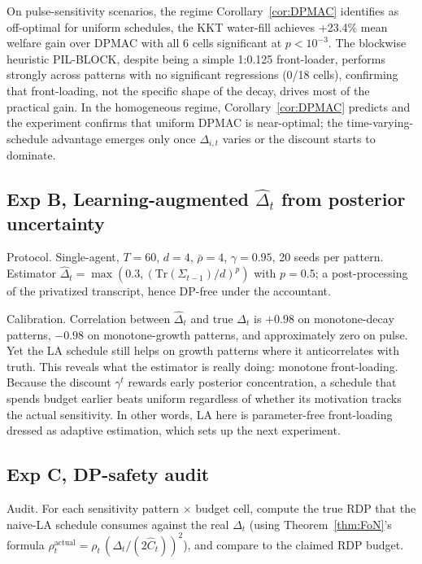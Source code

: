 \documentclass{article}
\begin{document}
On pulse-sensitivity scenarios, the regime Corollary~\ref{cor:DPMAC} identifies as off-optimal for uniform schedules, the KKT water-fill achieves +23.4\% mean welfare gain over DPMAC with all 6 cells significant at $p<10^{-3}$. The blockwise heuristic PIL-BLOCK, despite being a simple 1:0.125 front-loader, performs strongly across patterns with no significant regressions (0/18 cells), confirming that front-loading, not the specific shape of the decay, drives most of the practical gain. In the homogeneous regime, Corollary~\ref{cor:DPMAC} predicts and the experiment confirms that uniform DPMAC is near-optimal; the time-varying-schedule advantage emerges only once $\Delta_{i,t}$ varies or the discount starts to dominate.


\subsection{Exp B, Learning-augmented $\hat\Delta_t$ from posterior uncertainty}

Protocol. Single-agent, $T = 60$, $d = 4$, $\bar\rho = 4$, $\gamma = 0.95$, 20 seeds per pattern. Estimator $\hat\Delta_t = \max(0.3, (\mathrm{Tr}(\Sigma_{t-1})/d)^p)$ with $p = 0.5$; a post-processing of the privatized transcript, hence DP-free under the accountant.

Calibration. Correlation between $\hat\Delta_t$ and true $\Delta_t$ is $+0.98$ on monotone-decay patterns, $-0.98$ on monotone-growth patterns, and approximately zero on pulse. Yet the LA schedule still helps on growth patterns where it anticorrelates with truth. This reveals what the estimator is really doing: monotone front-loading. Because the discount $\gamma^t$ rewards early posterior concentration, a schedule that spends budget earlier beats uniform regardless of whether its motivation tracks the actual sensitivity. In other words, LA here is parameter-free front-loading dressed as adaptive estimation, which sets up the next experiment.

\subsection{Exp C, DP-safety audit}

Audit. For each sensitivity pattern $\times$ budget cell, compute the true RDP that the naive-LA schedule consumes against the real $\Delta_t$ (using Theorem~\ref{thm:FoN}'s formula $\rho_t^{\mathrm{actual}} = \rho_t\, (\Delta_t/(2\hat C_t))^2$), and compare to the claimed RDP budget.
\end{document}
